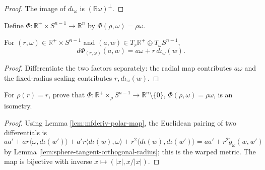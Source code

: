 \begin{proof}
\leanok
\sketch The image of $d\iota_\omega$ is $(\mathbb R\omega)^\perp$.
\end{proof}

\begin{definition}
\label{def:polar-map}
\leanok
{}
Define $\Phi:\mathbb R^+\times S^{n-1}\to\mathbb R^n$ by $\Phi(\rho,\omega)=\rho\omega$.
\end{definition}

\begin{lemma}
\label{lem:mfderiv-polar-map}
\leanok
{}
For $(r,\omega)\in\mathbb R^+\times S^{n-1}$ and $(a,w)\in T_r\mathbb R^+\oplus T_\omega S^{n-1}$,
\[
d\Phi_{(r,\omega)}(a,w)=a\omega+r\,d\iota_\omega(w).
\]
\end{lemma}

\begin{proof}
\leanok
\sketch Differentiate the two factors separately: the radial map contributes $a\omega$ and the fixed-radius scaling contributes $r,d\iota_\omega(w)$.
\end{proof}

\begin{exercise}\label{prob:warped-product-isometry}
\leanok
{}
For $\rho(r)=r$, prove that $\Phi:\mathbb R^+\times_\rho S^{n-1}\to\mathbb R^n\setminus\{0\}$, $\Phi(\rho,\omega)=\rho\omega$, is an isometry.
\end{exercise}

\begin{proof}
\leanok
{}
\sketch Using Lemma \ref{lem:mfderiv-polar-map}, the Euclidean pairing of two differentials is
\[
aa'+ar\langle\omega,d\iota(w')\rangle+a'r\langle d\iota(w),\omega\rangle+r^2\langle d\iota(w),d\iota(w')\rangle
=aa'+r^2\mathring g_\omega(w,w')
\]
by Lemma \ref{lem:sphere-tangent-orthogonal-radius}; this is the warped metric. The map is bijective with inverse $x\mapsto(|x|,x/|x|)$.
\end{proof}

